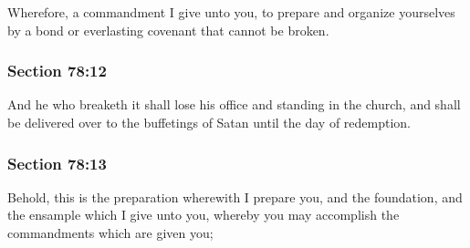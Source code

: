 		Wherefore, a commandment I give unto you, to prepare and organize yourselves by a bond or everlasting covenant that cannot be broken.


	\subsubsection{Section 78:12} %
		\label{DC78-12}

		And he who breaketh it shall lose his office and standing in the church, and shall be delivered over to the buffetings of Satan until the day of redemption.


	\subsubsection{Section 78:13} %
		\label{DC78-13}

		Behold, this is the preparation wherewith I prepare you, and the foundation, and the ensample which I give unto you, whereby you may accomplish the commandments which are given you;

